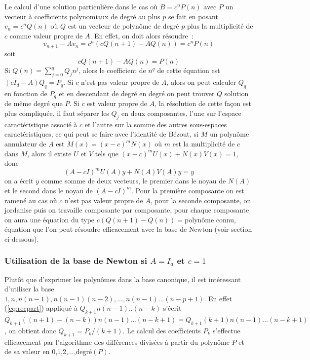 \documentclass[a4paper,11pt]{article}
\begin{document}
\begin{giacjshere}
Le calcul d'une solution particulière dans le cas où 
$B=c^n P(n)$ avec $P$ un vecteur à coefficients polynomiaux
de degré au plus $p$ se fait en posant $v_n=c^n Q(n)$
où $Q$ est un vecteur de polynôme de degré $p$ plus la multiplicité
de $c$ comme valeur propre de $A$. En effet, on doit alors résoudre~:
$$v_{n+1}-Av_n = c^n (c Q(n+1)- AQ(n)) = c^n P(n)  $$
soit
\begin{equation} \label{eq:recpart}
c Q(n+1)- AQ(n) = P(n)
\end{equation}
Si $Q(n)=\sum_{j=0}^q Q_j n^j$, alors le coefficient de $n^q$ de cette équation
est $(c I_d -A)Q_q=P_q$. Si $c$ n'est pas valeur propre de $A$, alors
on peut calculer $Q_q$ en fonction de $P_q$ et en descendant de degré en degré
on peut trouver $Q$ solution de même degré que $P$. Si $c$ est valeur
propre de $A$, la résolution de cette façon
est plus compliquée, il faut séparer les
$Q_j$ en deux composantes, l'une sur l'espace caractéristique associé
à $c$ et l'autre sur la somme des autres sous-espaces caractéristiques,
ce qui peut se faire avec l'identité de Bézout, si $M$ un polynôme annulateur
de $A$ est $M(x)=(x-c)^m N(x)$ où $m$ est la multiplicité de $c$ dans $M$,
alors il existe $U$ et $V$ tels que $(x-c)^mU(x)+N(x)V(x)=1$, donc
\[ (A-cI)^m U(A)y+N(A)V(A)y= y\]
on a écrit $y$ comme somme de deux vecteurs, le premier dans le noyau de
$N(A)$ et le second dans le noyau de $(A-cI)^m$. Pour la première
composante on est ramené au cas où $c$ n'est pas valeur propre de $A$,
pour la seconde composante, on jordanise puis on travaille composante
par composante, pour chaque composante on aura une équation du type
$c(Q(n+1)-Q(n))=$polynôme connu, équation 
que l'on peut résoudre efficacement avec
la base de Newton (voir section ci-dessous).

\subsubsection{Utilisation de la base de Newton si $A=I_d$ et $c=1$}
Plutôt que d'exprimer les polynômes dans la base canonique, il est
intéressant d'utiliser la base $1,n,n(n-1),n(n-1)(n-2),...,n(n-1)...(n-p+1)$.
En effet (\ref{eq:recpart}) appliqué à $Q_{k+1} n(n-1)..(n-k)$ s'écrit
$Q_{k+1}((n+1)-(n-k))n(n-1)...(n-k+1)=Q_{k+1}(k+1)n(n-1)...(n-k+1)$, on obtient
donc $Q_{k+1}=P_{k}/(k+1)$. Le calcul des coefficients $P_k$ s'effectue
efficacement par l'algorithme des différences divisées à partir
du polynôme $P$ et de sa valeur en 0,1,2,...,degré$(P)$.


\end{giacjshere}
\end{document}
